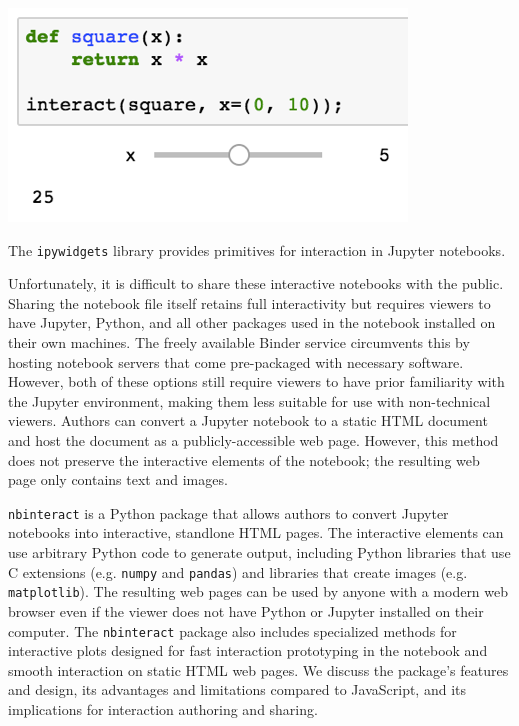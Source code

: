 \documentclass[nobib]{tufte-handout}
\newcommand{\code}[1]{\texttt{#1}}
\begin{document}
\begin{marginfigure}%
  \includegraphics[width=\linewidth]{graphics/ipywidgets.png}
  \caption{The \code{ipywidgets} library provides primitives for interaction
  in Jupyter notebooks.}
  \label{fig:ipywidgets}
\end{marginfigure}

Unfortunately, it is difficult to share these interactive notebooks with the
public. Sharing the notebook file itself retains full interactivity but
requires viewers to have Jupyter, Python, and all other packages used in the
notebook installed on their own machines. The freely available Binder service
circumvents this by hosting notebook servers that come pre-packaged with
necessary software. However, both of these options still require viewers to
have prior familiarity with the Jupyter environment, making them less suitable
for use with non-technical viewers. Authors can convert a Jupyter notebook to a
static HTML document and host the document as a publicly-accessible web page.
However, this method does not preserve the interactive elements of the
notebook; the resulting web page only contains text and images.

\code{nbinteract} is a Python package that allows authors to convert Jupyter
notebooks into interactive, standlone HTML pages. The interactive elements can
use arbitrary Python code to generate output, including Python libraries that
use C extensions (e.g. \code{numpy} and \code{pandas}) and libraries that
create images (e.g. \code{matplotlib}). The resulting web pages can be used by
anyone with a modern web browser even if the viewer does not have Python or
Jupyter installed on their computer. The \code{nbinteract} package also
includes specialized methods for interactive plots designed for fast
interaction prototyping in the notebook and smooth interaction on static HTML
web pages. We discuss the package's features and design, its advantages and
limitations compared to JavaScript, and its implications for interaction
authoring and sharing.
\end{document}
